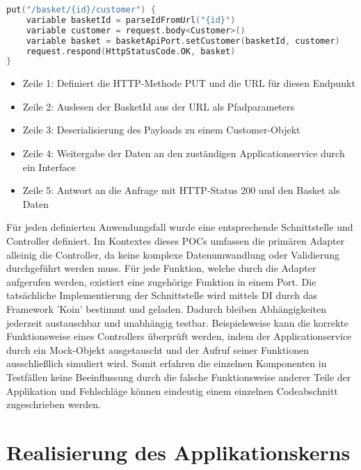\begin{minipage}{\linewidth} %
\begin{lstlisting}[caption={Beispiel eines Controllers zum aktualiseren von Kundendaten}, label={lst:controller}, language=Kotlin]
put("/basket/{id}/customer") { 
	variable basketId = parseIdFromUrl("{id}")
	variable customer = request.body<Customer>()  
	variable basket = basketApiPort.setCustomer(basketId, customer)
	request.respond(HttpStatusCode.OK, basket)
}
\end{lstlisting}
\end{minipage}

\begin{itemize}[noitemsep,nolistsep]
	\item Zeile 1: Definiert die HTTP-Methode PUT und die URL für diesen Endpunkt
	\item Zeile 2: Auslesen der BasketId aus der URL als Pfadparameters 
	\item Zeile 3: Deserialisierung des Payloads zu einem Customer-Objekt
	\item Zeile 4: Weitergabe der Daten an den zuständigen Applicationservice durch ein Interface
	\item Zeile 5: Antwort an die Anfrage mit HTTP-Status 200 und den Basket als Daten
\end{itemize}

Für jeden definierten Anwendungsfall wurde eine entsprechende Schnittstelle und Controller definiert. Im Kontextes dieses POCs umfassen die primären Adapter alleinig die Controller, da keine komplexe Datenumwandlung oder Validierung durchgeführt werden muss. Für jede Funktion, welche durch die Adapter aufgerufen werden, existiert eine zugehörige Funktion in einem Port. Die tatsächliche Implementierung der Schnittstelle wird mittels \acrlong{DI} durch das Framework 'Koin' bestimmt und geladen. Dadurch bleiben Abhängigkeiten jederzeit austauschbar und unabhängig testbar. Beispielsweise kann die korrekte Funktionsweise eines Controllers überprüft werden, indem der Applicationservice durch ein Mock-Objekt ausgetauscht und der Aufruf seiner Funktionen ausschließlich simuliert wird. Somit erfahren die einzelnen Komponenten in Testfällen keine Beeinflussung durch die falsche Funktionsweise anderer Teile der Applikation und Fehlschläge können eindeutig einem einzelnen Codeabschnitt zugeschrieben werden.



\section{Realisierung des Applikationskerns}

